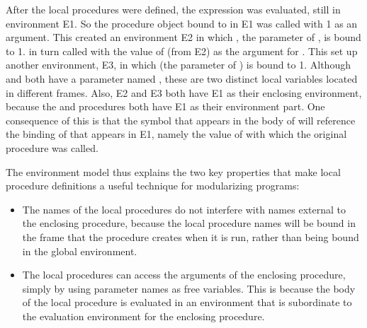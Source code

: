 After the local procedures were defined, the expression 
was evaluated, still in environment E1.  So the procedure object bound to
 in E1 was called with 1 as an argument.  This created an
environment E2 in which , the parameter of , is
bound to 1.   in turn called  with the value
of  (from E2) as the argument for .  This set up
another environment, E3, in which  (the parameter of
) is bound to 1.  Although  and
 both have a parameter named , these are two
distinct local variables located in different frames.  Also, E2 and E3 both
have E1 as their enclosing environment, because the  and
 procedures both have E1 as their environment part.  One
consequence of this is that the symbol  that appears in the body of
 will reference the binding of  that appears in E1,
namely the value of  with which the original  procedure was
called.

The environment model thus explains the two key properties that make local
procedure definitions a useful technique for modularizing programs:

\begin{itemize}
\item
The names of the local procedures do not interfere with names external to the
enclosing procedure, because the local procedure names will be bound in the
frame that the procedure creates when it is run, rather than being bound in the
global environment.

\item
The local procedures can access the arguments of the enclosing procedure,
simply by using parameter names as free variables.  This is because the body of
the local procedure is evaluated in an environment that is subordinate to the
evaluation environment for the enclosing procedure.
\end{itemize}

